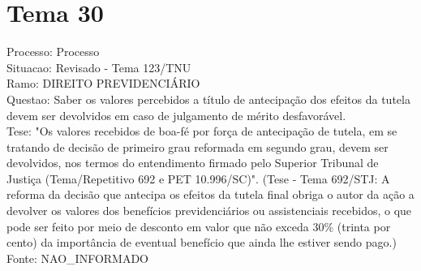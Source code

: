 \documentclass[12pt]{article}
\begin{document}
\section*{Tema 30}
Processo: Processo\\
Situacao: Revisado - Tema 123/TNU\\
Ramo: DIREITO PREVIDENCIÁRIO\\
Questao: Saber os valores percebidos a título de antecipação dos efeitos da tutela devem ser devolvidos em caso de julgamento de mérito desfavorável.\\
Tese: "Os valores recebidos de boa-fé por força de antecipação de tutela, em se tratando de decisão de primeiro grau reformada em segundo grau, devem ser devolvidos, nos termos do entendimento firmado pelo Superior Tribunal de Justiça (Tema/Repetitivo 692 e PET 10.996/SC)". (Tese - Tema 692/STJ: A reforma da decisão que antecipa os efeitos da tutela final obriga o autor da ação a devolver os valores dos benefícios previdenciários ou assistenciais recebidos, o que pode ser feito por meio de desconto em valor que não exceda 30\% (trinta por cento) da importância de eventual benefício que ainda lhe estiver sendo pago.)\\
Fonte: NAO\_INFORMADO
\end{document}
